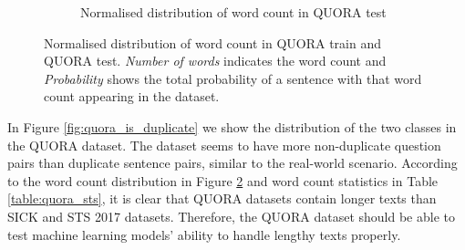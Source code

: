 \begin{enumerate}
\begin{figure}
\begin{subfigure}[b]{.5\textwidth}
		\caption{Normalised distribution of word count in QUORA test}
		\label{fig:quora_test_words}
	\end{subfigure}
	\caption[Normalised distribution of word count in QUORA train and QUORA test.]{Normalised distribution of word count in QUORA train and QUORA test. \textit{Number of words} indicates the word count and \textit{Probability} shows the total probability of a sentence with that word count appearing in the dataset.}
	\label{fig:quora_words}
\end{figure}

In Figure \ref{fig:quora_is_duplicate} we show the distribution of the two classes in the QUORA dataset. The dataset seems to have more non-duplicate question pairs than duplicate sentence pairs, similar to the real-world scenario. According to the word count distribution in Figure \ref{fig:quora_words} and word count statistics in Table \ref{table:quora_sts}, it is clear that QUORA datasets contain longer texts than SICK and STS 2017 datasets. Therefore, the QUORA dataset should be able to test machine learning models' ability to handle lengthy texts properly. 


\end{enumerate}
